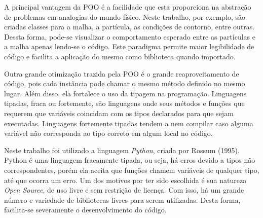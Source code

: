 A principal vantagem da POO é a facilidade que esta proporciona na abstração de problemas em analogias do mundo físico.
Neste trabalho, por exemplo, são criadas classes para a malha, a partícula, as condições de contorno, entre outras.
Dessta forma, pode-se visualizar o comportamento esperado entre as partículas e a malha apenas lendo-se o código.
Este paradigma permite maior legibilidade de código e facilita a aplicação do mesmo como biblioteca quando importado.

Outra grande otimização trazida pela POO é o grande reaproveitamento de código, pois cada instância pode chamar o mesmo método definido no mesmo lugar.
Além disso, ela fortalece o uso da tipagem na programação.
Linguagens tipadas, fraca ou fortemente, são linguagens onde seus métodos e funções que requerem que variáveis coincidam com os tipos declarados para que sejam executadas.
Linguagens fortemente tipadas tendem a nem compilar caso alguma variável não corresponda ao tipo correto em algum local no código.

Neste trabalho foi utilizado a linguagem \textit{Python}, criada por Rossum (1995)\cite{python}.
Python é uma linguagem fracamente tipada, ou seja, há erros devido a tipos não correspondentes, porém ela aceita que funções chamem variáveis de qualquer tipo, até que ocorra um erro.
Um dos motivos por ter sido escolhida é sua natureza \textit{Open Source}, de uso livre e sem restrição de licença.
Com isso, há um grande número e variedade de bibliotecas livres para serem utilizadas.
Desta forma, facilita-se severamente o desenvolvimento do código.
